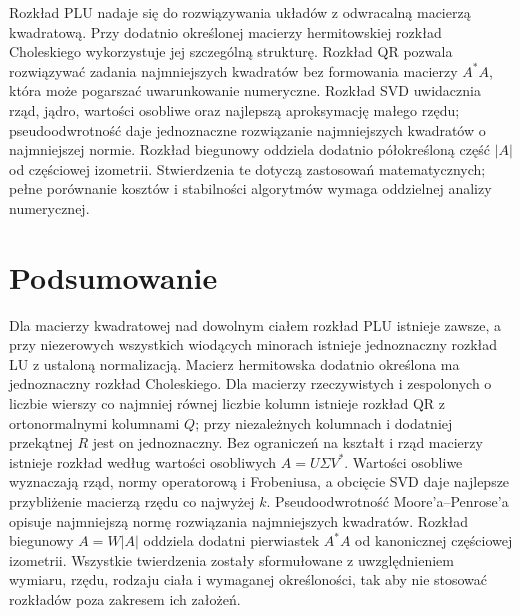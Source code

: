 \begin{uwaga}
\label{rem:lin15-which}
Rozkład PLU nadaje się
do rozwiązywania układów
z odwracalną macierzą kwadratową.
Przy dodatnio określonej
macierzy hermitowskiej
rozkład Choleskiego wykorzystuje
jej szczególną strukturę.
Rozkład QR pozwala rozwiązywać
zadania najmniejszych kwadratów
bez formowania macierzy \(A^*A\),
która może pogarszać uwarunkowanie
numeryczne. Rozkład SVD
uwidacznia rząd, jądro,
wartości osobliwe oraz
najlepszą aproksymację
małego rzędu;
pseudoodwrotność daje
jednoznaczne rozwiązanie
najmniejszych kwadratów
o najmniejszej normie.
Rozkład biegunowy oddziela
dodatnio półokreśloną część
\(|A|\) od częściowej izometrii.
Stwierdzenia te dotyczą
zastosowań matematycznych;
pełne porównanie kosztów
i stabilności algorytmów
wymaga oddzielnej analizy
numerycznej.
\end{uwaga}

\section{Podsumowanie}
\label{sec:lin15-podsumowanie}

Dla macierzy kwadratowej
nad dowolnym ciałem rozkład
PLU istnieje zawsze,
a przy niezerowych wszystkich
wiodących minorach istnieje
jednoznaczny rozkład LU
z ustaloną normalizacją.
Macierz hermitowska
dodatnio określona ma
jednoznaczny rozkład Choleskiego.
Dla macierzy rzeczywistych
i zespolonych o liczbie
wierszy co najmniej równej
liczbie kolumn istnieje
rozkład QR z ortonormalnymi
kolumnami \(Q\);
przy niezależnych kolumnach
i dodatniej przekątnej \(R\)
jest on jednoznaczny.
Bez ograniczeń na kształt
i rząd macierzy istnieje
rozkład według wartości
osobliwych \(A=U\Sigma V^*\).
Wartości osobliwe wyznaczają
rząd, normy operatorową
i Frobeniusa, a obcięcie SVD
daje najlepsze przybliżenie
macierzą rzędu co najwyżej \(k\).
Pseudoodwrotność
Moore'a--Penrose'a opisuje
najmniejszą normę rozwiązania
najmniejszych kwadratów.
Rozkład biegunowy
\(A=W|A|\) oddziela
dodatni pierwiastek
\(A^*A\) od kanonicznej
częściowej izometrii.
Wszystkie twierdzenia
zostały sformułowane
z uwzględnieniem wymiaru,
rzędu, rodzaju ciała
i wymaganej określoności,
tak aby nie stosować
rozkładów poza zakresem
ich założeń.
